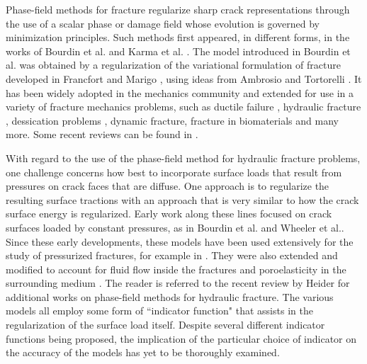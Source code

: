 Phase-field methods for fracture regularize sharp crack representations through the use of a scalar phase or damage field whose evolution is governed by minimization principles.  
Such methods first appeared, in different forms, in the works of Bourdin et al. \cite{bourdin2000numerical} and Karma et al. \cite{karma2001phase}. The model introduced in Bourdin et al. \cite{bourdin2000numerical} was obtained by a regularization of the variational formulation of fracture developed in Francfort and Marigo \cite{francfort1998revisiting}, using ideas from Ambrosio and Tortorelli \cite{ambrosio1990approximation}. It has been widely adopted in the mechanics community and extended for use in a variety of fracture mechanics problems,  such as ductile failure \cite{alessi2014gradient, ambati2015phase, miehe2016phase, borden2016phase, hu2021variationalpaper}, hydraulic fracture \cite{wilson2016phase, chukwudozie2019variational, mikelic2015phase1, santillan2018phase, miehe2016phase}, dessication problems \cite{maurini2013crack, heider2020phase, cajuhi2018phase, hu2020frictionless}, dynamic fracture\cite{bourdin2011time, borden2012phase, hofacker2013phase, schluter2014phase, li2016gradient, kamensky2018hyperbolic, moutsanidis2018hyperbolic}, fracture in biomaterials \cite{wu2020fracture, raina2016phase, nagaraja2021phase, gultekin2016phase, gultekin2018numerical} and many more. Some recent reviews can be found in \cite{ambati2015review, wu2020phase, francfort2021variational}.

With regard to the use of the phase-field method for hydraulic fracture problems, one challenge concerns how best to incorporate surface loads that result from pressures on crack faces that are diffuse.  One approach is to regularize the resulting surface tractions with an approach that is very similar to how the crack surface energy is regularized. Early work along these lines focused on crack surfaces loaded by constant pressures, as in Bourdin et al. \cite{bourdin2012variational} and Wheeler et al.\cite{wheeler2014augmented}. Since these early developments, these models have been used extensively for the study of pressurized fractures, for example in \cite{tanne2022loss, zulian2021large, yoshioka2019comparative, yoshioka2020crack}.
They were also extended and modified to account for fluid flow inside the fractures and poroelasticity in the surrounding medium \cite{miehe2016phase, mikelic2015phase1, chukwudozie2019variational, wilson2016phase, santillan2018phase, heider2017phase, li2022hydro}. The reader is referred to the recent review by  Heider \cite{heider2021review} for additional works on phase-field methods for hydraulic fracture.  The various models all employ some form of ``indicator function" that assists in the regularization of the surface load itself.  Despite several different indicator functions being proposed, the implication of the particular choice of indicator on the accuracy of the models has yet to be thoroughly examined.  

